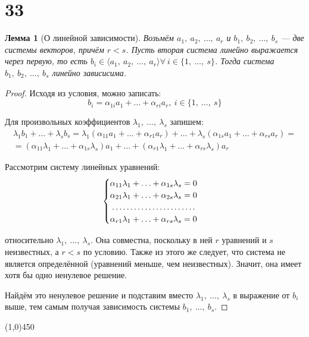 \documentclass[a4paper,12pt]{article}
\newtheorem*{lem}{Лемма}
\begin{document}
	\section*{33}
	\begin{lem} [О линейной зависимости]
		Возьмём $a_1,\ a_2,\ \ldots,\ a_r$ и $b_1,\ b_2,\ \ldots,\ b_s$ --- две системы векторов, причём $r < s$. Пусть вторая система линейно выражается через первую, то есть $b_i \in \langle a_1,\ a_2,\ \ldots,\ a_r \rangle \forall\ i \in \{1,\ \ldots ,\ s\}$. Тогда система $b_1,\ b_2,\ \ldots,\ b_s$ линейно зависисима.
	\end{lem}
	\begin{proof}
		Исходя из условия, можно записать:
		\[b_i = \alpha_{1i}a_1 + \ldots + \alpha_{ri}a_r,\   i \in \{ 1,\ \ldots,\ s\}
		\]
		
		Для произвольных коэффициентов $\lambda_1,\ \ldots,\ \lambda_s$ запишем:
		\begin{gather*}
		\lambda_1 b_1 + \ldots + \lambda_s b_s = \lambda_1(\alpha_{11}a_1 + \ldots + \alpha_{r1}a_r) + \ldots + \lambda_s(\alpha_{1s}a_1 + \ldots + \alpha_{rs}a_r) = \\ =(\alpha_{11}\lambda_1 + \ldots + \alpha_{1s}\lambda_s)a_1 + \ldots + (\alpha_{r1}\lambda_1 + \ldots + \alpha_{rs}\lambda_s)a_r
		\end{gather*} 
		
		Рассмотрим систему линейных уравнений:
		\[\begin{cases}
		\alpha_{11}\lambda_1 + \ldots + \alpha_{1s}\lambda_s = 0 \\
		\alpha_{21}\lambda_1 + \ldots + \alpha_{2s}\lambda_s = 0 \\
		\dotfill \\
		\alpha_{r1}\lambda_1 + \ldots + \alpha_{rs}\lambda_s = 0 
		\end{cases}\]
		
		относительно $\lambda_1,\ \ldots,\ \lambda_s$. Она совместна, поскольку в ней $r$ уравнений и $s$ неизвестных, а $r < s$ по условию. Также из этого же следует, что система не является определённой (уравнений меньше, чем неизвестных). Значит, она имеет хотя бы одно ненулевое решение.
		
		Найдём это ненулевое решение и подставим вместо $\lambda_1,\ \ldots,\ \lambda_s$ в выражение от $b_i$ выше, тем самым получая зависимость системы $b_1,\ \ldots,\ b_s$. 
	\end{proof}
	\begin{center}
		\line(1,0){450}
	\end{center}
\end{document}
